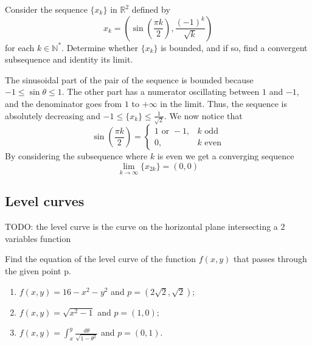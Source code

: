 \documentclass[a4paper]{article}
\begin{document}
Consider the sequence \(\{x_k\}\) in \({\mathbb{R}}^2\)
defined by \[ x_k = \left( \sin\left(\frac{\pi k}{2}\right), \frac{{(-1)}^k}{\sqrt{k}} \right) \]
for each \(k \in {\mathbb{N}}^*\).
Determine whether \(\{x_k\}\) is bounded, and if so, find a convergent subsequence
and identity its limit.

The sinusoidal part of the pair of the sequence is bounded because \(-1 \leq \sin\theta \leq 1\).
The other part has a numerator oscillating between \(1\) and \(-1\),
and the denominator goes from \(1\) to \(+\infty\) in the limit.
Thus, the sequence is absolutely decreasing and \(-1 \leq \{x_k\} \leq \frac{1}{\sqrt{2}}\).
We now notice that
\[
    \sin\left(\frac{\pi k}{2}\right)
    = \begin{cases}
        1 \text{ or } -1, & k \text{ odd} \\
        0, & k \text{ even}
    \end{cases}
\]
By considering the subsequence where \(k\) is even we get a converging sequence
\[
    \lim_{k \to \infty} \{x_{2k}\} = (0, 0) 
\]

\subsection{Level curves}

TODO: the level curve is the curve on the horizontal plane intersecting a 2 variables function

Find the equation of the level curve of the function \(f(x,y)\) that passes through
the given point p.
\begin{enumerate}
    \item \(f(x,y) = 16-x^2-y^2\) and \(p=(2\sqrt{2}, \sqrt{2})\);
    \item \(f(x,y) = \sqrt{x^2-1}\) and \(p=(1,0)\);
    \item \(f(x,y) = \int_x^y \frac{d\theta}{\sqrt{1-\theta^2}}\) and \(p=(0,1)\).
\end{enumerate}
\end{document}
